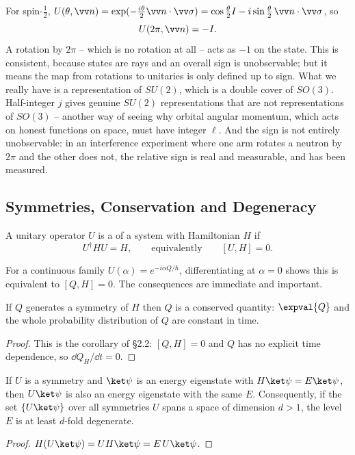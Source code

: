 \begin{remark}
    For spin-$\frac12$, $U(\theta, \vv n) = \exp(-\frac{i\theta}{2}\vv n \cdot \vv\sigma) = \cos\frac\theta2 I - i \sin\frac\theta2 \,\vv n\cdot\vv\sigma$, so
    $$
    U(2\pi, \vv n) = -I.
    $$
    A rotation by $2\pi$ -- which is no rotation at all -- acts as $-1$ on the state. This is consistent, because states are rays and an overall sign is unobservable; but it means the map from rotations to unitaries is only defined up to sign. What we really have is a representation of $SU(2)$, which is a double cover of $SO(3)$. Half-integer $j$ gives genuine $SU(2)$ representations that are not representations of $SO(3)$ -- another way of seeing why orbital angular momentum, which acts on honest functions on space, must have integer $\ell$. And the sign is not entirely unobservable: in an interference experiment where one arm rotates a neutron by $2\pi$ and the other does not, the relative sign is real and measurable, and has been measured.
\end{remark}

\subsection{Symmetries, Conservation and Degeneracy}

\begin{definition}[Symmetry]
    A unitary operator $U$ is a  of a system with Hamiltonian $H$ if
    $$
    U^\dagger H U = H, \qquad \text{equivalently} \qquad [U, H] = 0.
    $$
\end{definition}

For a continuous family $U(\alpha) = e^{-i\alpha Q/\hbar}$, differentiating at $\alpha = 0$ shows this is equivalent to $[Q, H] = 0$. The consequences are immediate and important.

\begin{theorem}
    If $Q$ generates a symmetry of $H$ then $Q$ is a conserved quantity: $\expval{Q}$ and the whole probability distribution of $Q$ are constant in time.
\end{theorem}
\begin{proof}
    This is the corollary of \S2.2: $[Q,H] = 0$ and $Q$ has no explicit time dependence, so $\dd Q_H/\dd t = 0$.
\end{proof}

\begin{theorem}
    If $U$ is a symmetry and $\ket\psi$ is an energy eigenstate with $H\ket\psi = E\ket\psi$, then $U\ket\psi$ is also an energy eigenstate with the same $E$. Consequently, if the set $\{U\ket\psi\}$ over all symmetries $U$ spans a space of dimension $d > 1$, the level $E$ is at least $d$-fold degenerate.
\end{theorem}
\begin{proof}
    $H(U\ket\psi) = UH\ket\psi = E \, U\ket\psi$.
\end{proof}

